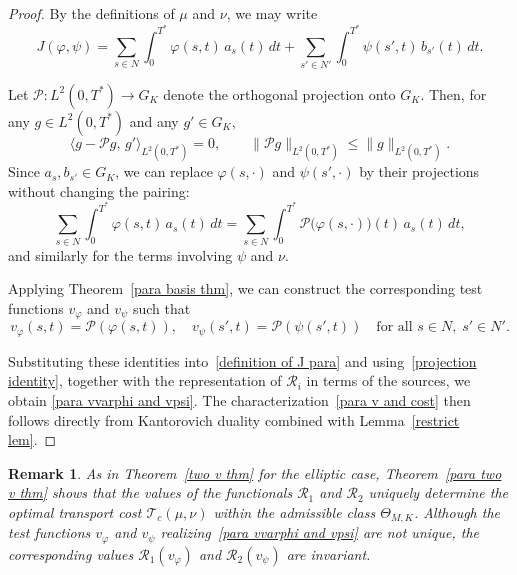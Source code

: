 \documentclass[12pt]{amsart}
\newtheorem{remark}{Remark}
\begin{document}
\begin{proof}
    By the definitions of \(\mu\) and \(\nu\), we may write
    \begin{equation}\label{definition of J  para}
        J(\varphi, \psi)
        = \sum_{s \in N} \int_0^{T^*} \varphi(s,t)\, a_s(t)\,dt
        + \sum_{s' \in N'} \int_0^{T^*} \psi(s',t)\, b_{s'}(t)\,dt.
    \end{equation}

    Let \(\mathcal{P}: L^2(0, T^*) \to G_K\) denote the orthogonal projection onto \(G_K\).  
    Then, for any \(g\in L^2(0,T^*)\) and any \(g'\in G_K\),
    \[
    \langle g - \mathcal{P}g,\, g' \rangle_{L^2(0,T^*)} = 0,
    \qquad
    \|\mathcal{P}g\|_{L^2(0,T^*)} \le \|g\|_{L^2(0,T^*)}.
    \]
    Since \(a_s, b_{s'}\in G_K\), we can replace \(\varphi(s,\cdot)\) and \(\psi(s',\cdot)\) by their projections without changing the pairing:
    \begin{equation}\label{projection identity}
        \sum_{s \in N} \int_0^{T^*} \varphi(s,t)\, a_s(t)\,dt
        = \sum_{s\in N} \int_0^{T^*} \mathcal{P}\bigl(\varphi(s,\cdot)\bigr)(t)\, a_s(t)\,dt,
    \end{equation}
    and similarly for the terms involving \(\psi\) and \(\nu\).

    Applying Theorem~\ref{para basis thm}, we can construct the corresponding test functions \( v_\varphi \) and \( v_\psi \) such that
    \begin{equation*}
        v_\varphi(s, t) = \mathcal{P}(\varphi(s, t)), \quad 
        v_\psi(s', t) = \mathcal{P}(\psi(s', t)) 
        \quad \text{for all } s \in N,\; s' \in N'.
    \end{equation*}

    Substituting these identities into~\eqref{definition of J  para} and using~\eqref{projection identity}, together with the representation of \(\mathcal{R}_i\) in terms of the sources, we obtain \eqref{para vvarphi and vpsi}. The characterization~\eqref{para v and cost} then follows directly from Kantorovich duality combined with Lemma~\ref{restrict lem}.
\end{proof}

\begin{remark}
    As in Theorem~\ref{two v thm} for the elliptic case, Theorem~\ref{para two v thm} shows that the values of the functionals \( \mathcal{R}_1 \) and \( \mathcal{R}_2 \) uniquely determine the optimal transport cost \( \mathcal{T}_c(\mu, \nu) \) within the admissible class \(\Theta_{M,K}\).  
    Although the test functions \(v_\varphi\) and \(v_\psi\) realizing~\eqref{para vvarphi and vpsi} are not unique, the corresponding values \(\mathcal{R}_1(v_\varphi)\) and \(\mathcal{R}_2(v_\psi)\) are invariant.
\end{remark}
\end{document}
